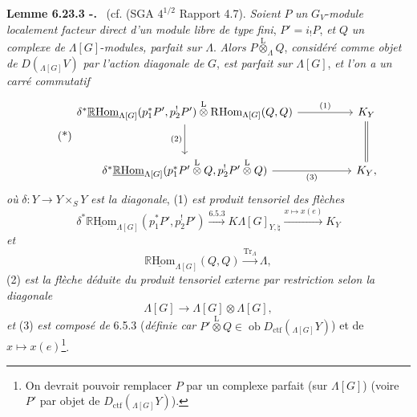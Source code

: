 \documentclass[11pt]{article}
\newenvironment{statement}[1]{\par\medskip\noindent\textbf{#1.}\ }{\par\medskip}
\newcommand{\R}{\mathbb{R}}\newcommand{\RHomCore}{\mathbb{R}\mathrm{Hom}}
\newcommand{\ob}{\operatorname{ob}}
\providecommand{\RHom}{\RHomCore}
\providecommand{\uRHom}{\underline{\RHom}}
\providecommand{\Tr}{\operatorname{Tr}}
\providecommand{\Tr}{\operatorname{Tr}}
\providecommand{\lten}{\overset{\mathrm L}{\otimes}}
\providecommand{\Tr}{\operatorname{Tr}}
\providecommand{\RHom}{\RHomCore}
\providecommand{\ob}{\operatorname{ob}}
\providecommand{\lten}{\overset{\mathrm L}{\otimes}}
\providecommand{\RHom}{\R\mathcal{H}om}
\providecommand{\lten}{\overset{\mathrm L}{\otimes}}
\providecommand{\R}{\mathrm R}
\providecommand{\Tr}{\operatorname{Tr}}
\providecommand{\lten}{\overset{\mathrm L}{\otimes}}
\providecommand{\lten}{\overset{\mathrm L}{\otimes}}
\providecommand{\lten}{\overset{\mathrm L}{\otimes}}
\providecommand{\RHom}{\RHomCore}
\providecommand{\Tr}{\operatorname{Tr}}
\providecommand{\lten}{\overset{\mathrm L}{\otimes}}
\begin{document}
\begin{statement}{Lemme 6.23.3 -}
(cf. (SGA $4^{1/2}$ Rapport 4.7). \emph{Soient} $P$ \emph{un} $G_V$-\emph{module localement facteur direct d'un module libre de type fini}, $P'=i_!P$, \emph{et} $Q$ \emph{un complexe de} $\Lambda[G]$-\emph{modules, parfait sur} $\Lambda$. \emph{Alors} $P\lten_{\Lambda}Q$, \emph{considéré comme objet de} $D({}_{\Lambda[G]}V)$ \emph{par l'action diagonale de} $G$, \emph{est parfait sur} $\Lambda[G]$, \emph{et l'on a un carré commutatif}
\begin{equation}
\tag{*}
\begin{tikzcd}[column sep=huge,row sep=large]
\delta^*\uRHom_{\Lambda[G]}(p_1^*P',p_2^!P')\lten
\mathrm{R}\mathrm{Hom}_{\Lambda[G]}(Q,Q) \arrow[r,"(1)"] \arrow[d,"(2)"']
& K_Y \arrow[d,equal]\\
\delta^*\uRHom_{\Lambda[G]}(p_1^*P'\lten Q,p_2^!P'\lten Q) \arrow[r,"(3)"']
& K_Y ,
\end{tikzcd}
\end{equation}
\emph{où} $\delta:Y\to Y\times_SY$ \emph{est la diagonale}, (1) \emph{est produit tensoriel des flèches}
\[
\delta^*\uRHom_{\Lambda[G]}(p_1^*P',p_2^!P')\xrightarrow{6.5.3}
K\Lambda[G]_{Y,\natural}\xrightarrow{x\mapsto x(e)}K_Y
\]
\emph{et}
\[
\uRHom_{\Lambda[G]}(Q,Q)\xrightarrow{\Tr_{\Lambda}}\Lambda,
\]
(2) \emph{est la flèche déduite du produit tensoriel externe par restriction selon la diagonale}
\[
\Lambda[G]\to\Lambda[G]\otimes\Lambda[G],
\]
\emph{et} (3) \emph{est composé de} 6.5.3 (\emph{définie car} $P'\lten Q\in\ob D_{\mathrm{ctf}}({}_{\Lambda[G]}Y)$) et de $x\mapsto x(e)$\footnote{On devrait pouvoir remplacer $P$ par un complexe parfait (sur $\Lambda[G]$) (voire $P'$ par objet de $D_{\mathrm{ctf}}({}_{\Lambda[G]}Y)$).}.
\end{statement}
\end{document}

